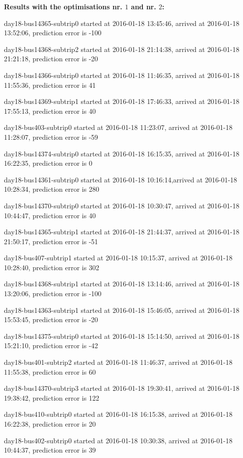 \documentclass[12pt,a4paper,oneside,openright]{report}
\begin{document}
\textbf{Results with the optimisations nr. $1$ and nr. $2$:} \\
{\footnotesize
day18-bus14365-subtrip0 started at 2016-01-18 13:45:46, arrived at 2016-01-18 13:52:06, prediction error is -100

day18-bus14368-subtrip2 started at 2016-01-18 21:14:38, arrived at 2016-01-18 21:21:18, prediction error is -20

day18-bus14366-subtrip0 started at 2016-01-18 11:46:35, arrived at 2016-01-18 11:55:36, prediction error is 41

day18-bus14369-subtrip1 started at 2016-01-18 17:46:33, arrived at 2016-01-18 17:55:13, prediction error is 40

day18-bus403-subtrip0 started at 2016-01-18 11:23:07,    arrived at 2016-01-18 11:28:07, prediction error is -59

day18-bus14374-subtrip0 started at 2016-01-18 16:15:35, arrived at 2016-01-18 16:22:35, prediction error is 0

day18-bus14361-subtrip0 started at 2016-01-18 10:16:14,arrived at 2016-01-18 10:28:34, prediction error is 280

day18-bus14370-subtrip0 started at 2016-01-18 10:30:47, arrived at 2016-01-18 10:44:47, prediction error is 40

day18-bus14365-subtrip1 started at 2016-01-18 21:44:37, arrived at 2016-01-18 21:50:17, prediction error is -51

day18-bus407-subtrip1 started at 2016-01-18 10:15:37,    arrived at 2016-01-18 10:28:40, prediction error is 302

day18-bus14368-subtrip1 started at 2016-01-18 13:14:46, arrived at 2016-01-18 13:20:06, prediction error is -100

day18-bus14363-subtrip1 started at 2016-01-18 15:46:05, arrived at 2016-01-18 15:53:45, prediction error is -20

day18-bus14375-subtrip0 started at 2016-01-18 15:14:50, arrived at 2016-01-18 15:21:10, prediction error is -42

day18-bus401-subtrip2 started at 2016-01-18 11:46:37,    arrived at 2016-01-18 11:55:38, prediction error is 60

day18-bus14370-subtrip3 started at 2016-01-18 19:30:41, arrived at 2016-01-18 19:38:42, prediction error is 122

day18-bus410-subtrip0 started at 2016-01-18 16:15:38,    arrived at 2016-01-18 16:22:38, prediction error is 20

day18-bus402-subtrip0 started at 2016-01-18 10:30:38,    arrived at 2016-01-18 10:44:37, prediction error is 39

}
\end{document}
